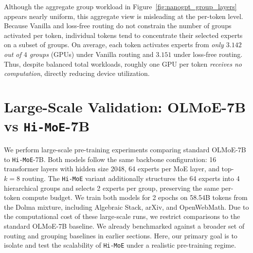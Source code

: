 \documentclass[sigconf,nonacm]{acmart}
\begin{document}
Although the aggregate group workload in Figure~\ref{fig:nanogpt_group_layers} appears
nearly uniform, this aggregate view is misleading at the per-token level.
Because Vanilla and loss-free routing do not constrain the number of groups activated
per token, individual tokens tend to concentrate their selected experts on a subset of
groups.
On average, each token activates experts from \emph{only $3.142$ out of $4$ groups}
(GPUs) under Vanilla routing and $3.151$ under loss-free routing.
Thus, despite balanced total workloads, roughly one GPU per
token \emph{receives no computation}, directly reducing device utilization. 

\section{Large-Scale Validation: OLMoE-7B vs \texttt{Hi-MoE}-7B}

We perform large-scale pre-training experiments comparing standard OLMoE-7B to \texttt{Hi-MoE}-7B. Both models follow the same backbone configuration: 16 transformer layers with hidden size 2048, 64 experts per MoE layer, and top-$k{=}8$ routing. The \texttt{Hi-MoE} variant additionally structures the 64 experts into 4 hierarchical groups and selects 2 experts per group, preserving the same per-token compute budget. We train both models for 2 epochs on 58.54B tokens from the Dolma mixture, including Algebraic Stack, arXiv, and OpenWebMath.
Due to the computational cost of these large-scale runs, we restrict comparisons to the standard OLMoE-7B baseline. We already benchmarked against a broader set of routing and grouping baselines in earlier sections. Here, our primary goal is to isolate and test the scalability of \texttt{Hi-MoE} under a realistic pre-training regime.
\end{document}

